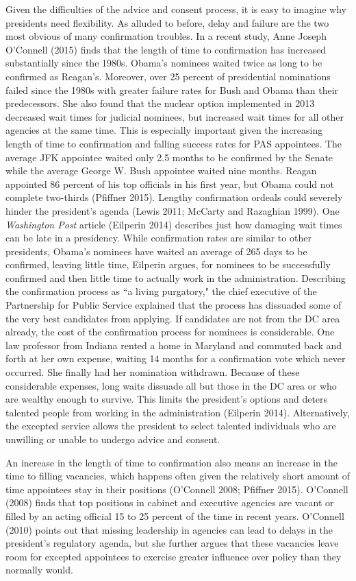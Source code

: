 \documentclass[12pt]{article}
\begin{document}
Given the difficulties of the advice and consent process, it is easy to imagine why presidents need flexibility. As alluded to before, delay and failure are the two most obvious of many confirmation troubles. In a recent study, Anne Joseph O'Connell (2015) finds that the length of time to confirmation has increased substantially since the 1980s. Obama's nominees waited twice as long to be confirmed as Reagan's. Moreover, over 25 percent of presidential nominations failed since the 1980s with greater failure rates for Bush and Obama than their predecessors. She also found that the nuclear option implemented in 2013 decreased wait times for judicial nominees, but increased wait times for all other agencies at the same time. This is especially important given the increasing length of time to confirmation and falling success rates for PAS appointees. The average JFK appointee waited only 2.5 months to be confirmed by the Senate while the average George W. Bush appointee waited nine months. Reagan appointed 86 percent of his top officials in his first year, but Obama could not complete two-thirds (Pfiffner 2015). Lengthy confirmation ordeals could severely hinder the president's agenda (Lewis 2011; McCarty and Razaghian 1999). One \textit{Washington Post} article (Eilperin 2014) describes just how damaging wait times can be late in a presidency. While confirmation rates are similar to other presidents, Obama's nominees have waited an average of 265 days to be confirmed, leaving little time, Eilperin argues, for nominees to be successfully confirmed and then little time to actually work in the administration. Describing the confirmation process as ``a living purgatory," the chief executive of the Partnership for Public Service explained that the process has dissuaded some of the very best candidates from applying. If candidates are not from the DC area already, the cost of the confirmation process for nominees is considerable. One law professor from Indiana rented a home in Maryland and commuted back and forth at her own expense, waiting 14 months for a confirmation vote which never occurred. She finally had her nomination withdrawn. Because of these considerable expenses, long waits dissuade all but those in the DC area or who are wealthy enough to survive. This limits the president's options and deters talented people from working in the administration (Eilperin 2014). Alternatively, the excepted service allows the president to select talented individuals who are unwilling or unable to undergo advice and consent. 

An increase in the length of time to confirmation also means an increase in the time to filling vacancies, which happens often given the relatively short amount of time appointees stay in their positions (O'Connell 2008; Pfiffner 2015). O'Connell (2008) finds that top positions in cabinet and executive agencies are vacant or filled by an acting official 15 to 25 percent of the time in recent years. O'Connell (2010) points out that missing leadership in agencies can lead to delays in the president's regulatory agenda, but she further argues that these vacancies leave room for excepted appointees to exercise greater influence over policy than they normally would.
\end{document}
